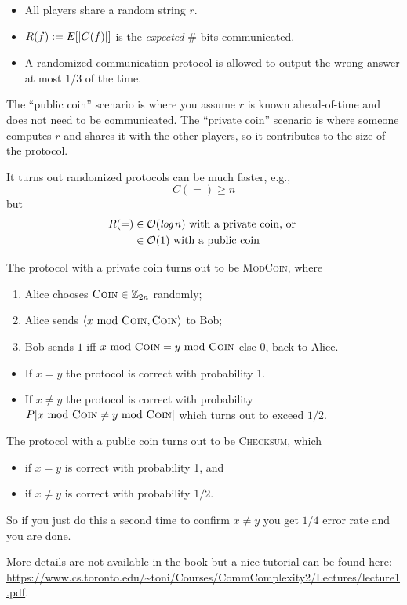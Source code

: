\documentclass[12pt]{article}
\begin{document}
\maketitle

\begin{itemize}
    \item All players share a random string $r$.
    \item $R(f) := E[\lvert C(f)\rvert]$ is the \emph{expected} \# bits communicated.
    \item A randomized communication protocol is allowed to output the wrong answer at most $1/3$ of the time.
\end{itemize}
The ``public coin'' scenario is where you assume $r$ is known ahead-of-time and does not need to be communicated.  The ``private coin'' scenario is where someone computes $r$ and shares it with the other players, so it contributes to the size of the protocol.

It turns out randomized protocols can be much faster, e.g.,
\[C(=) \geq n\]
but
\[\begin{aligned}R(=) & 
    \in \mathcal{O}(\emph{log} \, n) \text{ with a private coin, or } \\
    & \in \mathcal{O}(1) \text{ with a public coin }\end{aligned}\]

The protocol with a private coin turns out to be \textsc{ModCoin}, where
\begin{enumerate}
    \item Alice chooses $\textsc{Coin} \in \mathbb{Z}_{2n}$ randomly;
    \item Alice sends $\langle x \text{ mod } \textsc{Coin}, \textsc{Coin} \rangle$ to Bob;
    \item Bob sends $1$ iff $x \text{ mod } \textsc{Coin} = y \text{ mod } \textsc{Coin}$ else $0$, back to Alice.
\end{enumerate}
\begin{itemize}
    \item If $x = y$ the protocol is correct with probability 1.
    \item If $x \neq y$ the protocol is correct with probability $P[x \text{ mod } \textsc{Coin} \neq y \text{ mod } \textsc{Coin}]$ which turns out to exceed $1/2$.
\end{itemize}

The protocol with a public coin turns out to be \textsc{Checksum}, which
\begin{itemize}
    \item if $x = y$ is correct with probability 1, and
    \item if $x \neq y$ is correct with probability $1/2$.
\end{itemize}
So if you just do this a second time to confirm $x \neq y$ you get $1/4$ error rate and you are done.

More details are not available in the book but a nice tutorial can be found here: \url{https://www.cs.toronto.edu/~toni/Courses/CommComplexity2/Lectures/lecture1.pdf}.

% 
% 
\end{document}
